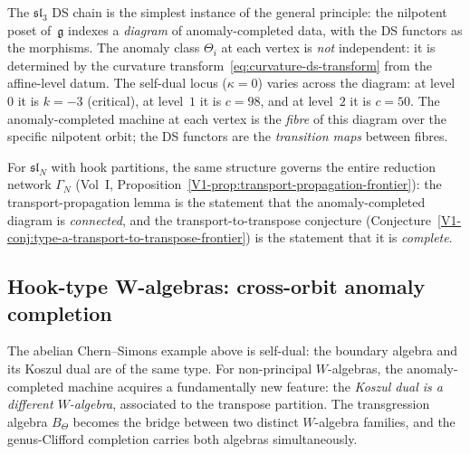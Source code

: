 \begin{remark}
The $\mathfrak{sl}_3$ DS chain is the simplest instance of
the general principle: the nilpotent poset of~$\mathfrak g$
indexes a \emph{diagram} of anomaly-completed data, with the
DS functors as the morphisms. The anomaly class $\Theta_i$ at
each vertex is \emph{not} independent: it is determined by the
curvature transform~\eqref{eq:curvature-ds-transform} from
the affine-level datum. The self-dual locus ($\kappa=0$)
varies across the diagram: at level~$0$ it is $k=-3$
(critical), at level~$1$ it is $c=98$, and at level~$2$ it
is $c=50$. The anomaly-completed machine at each vertex is
the \emph{fibre} of this diagram over the specific nilpotent
orbit; the DS functors are the \emph{transition maps} between
fibres.

For $\mathfrak{sl}_N$ with hook partitions, the same
structure governs the entire reduction network $\Gamma_N$
(Vol~I, Proposition~\ref*{V1-prop:transport-propagation-frontier}):
the transport-propagation lemma is the statement that the
anomaly-completed diagram is \emph{connected}, and the
transport-to-transpose conjecture
(Conjecture~\ref*{V1-conj:type-a-transport-to-transpose-frontier})
is the statement that it is \emph{complete}.
\end{remark}

\subsection{Hook-type W-algebras: cross-orbit anomaly completion}

The abelian Chern--Simons example above is self-dual: the boundary
algebra and its Koszul dual are of the same type. For non-principal
$W$-algebras, the anomaly-completed machine acquires a fundamentally
new feature: the \emph{Koszul dual is a different $W$-algebra},
associated to the transpose partition. The transgression algebra
$B_\Theta$ becomes the bridge between two distinct $W$-algebra families,
and the genus-Clifford completion carries both algebras simultaneously.

